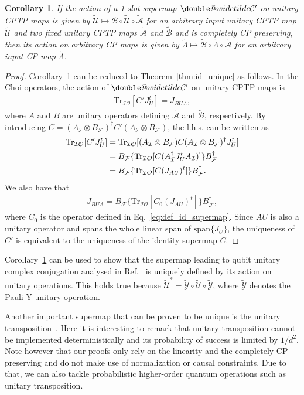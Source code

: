 \documentclass[a4paper,twocolumn,accepted=2022-10-23]{quantumarticle}
\makeatletter
\newcommand{\Tr}[0]{{\mathrm{Tr}}}
\newcommand{\fcal}[0]{{\mathcal{F}}}
\newcommand{\ical}[0]{{\mathcal{I}}}
\newcommand{\ocal}[0]{{\mathcal{O}}}
\newcommand{\doublewidetilde}[1]{{%
  \mathpalette\double@widetilde{#1}%
}}
\newcommand{\double@widetilde}[2]{%
  \sbox\z@{$\m@th#1\widetilde{#2}$}%
  \ht\z@=.9\ht\z@
  \widetilde{\box\z@}%
}
\newcommand{\ttsmap}[1]{\doublewidetilde{\mbox{$\mathcal{#1}$}}}
\newcommand{\tmap}[1]{\widetilde{\mbox{$\mathcal{#1}$}}}
\newcommand{\tmapf}[1]{\widetilde{\mbox{$#1$}}}
\newtheorem{coll}{Corollary}
\theoremstyle{definition}
\makeatother
\begin{document}
\begin{coll}\label{coll:single_unique}
If the action of a 1-slot supermap $\ttsmap{C'}$ on unitary CPTP maps is given by $\tmap{U} \mapsto \tmap{B} \circ \tmap{U} \circ \tmap{A}$ for an arbitrary input unitary CPTP map $\tmap{U}$ and two fixed unitary CPTP maps $\tmap{A}$ and $\tmap{B}$ and is completely CP preserving,
then its action on arbitrary CP maps is given by $\tmapf{\Lambda} \mapsto \tmap{B} \circ \tmapf{\Lambda} \circ \tmap{A}$ for an arbitrary input CP map $\tmapf{\Lambda}$.
\end{coll}
\begin{proof}
Corollary~\ref{coll:single_unique} can be reduced to Theorem~\ref{thm:id_unique} as follows.
In the Choi operators, the action of $\ttsmap{C'}$ on unitary CPTP maps is
\begin{align}
\Tr_{\ical \ocal} [ C' J_{U}^t ] = J_{BUA},
\end{align}
where $A$ and $B$ are unitary operators defining $\tmap{A}$ and $\tmap{B}$, respectively.
By introducing $C = (A_{\ical} \otimes B_{\fcal})^\dag C' (A_{\ical} \otimes B_{\fcal})$,
the l.h.s. can be written as
\begin{align}
\Tr_{\ical \ocal} [ C' J_{U}^t ]
&= \Tr_{\ical \ocal} [(A_\ical \otimes B_\fcal) C (A_\ical \otimes B_\fcal)^\dag J_U^t] \notag \\
&= B_\fcal \{ \Tr_{\ical \ocal} [C ( A_\ical^\dag J_U^t A_\ical )] \} B_\fcal^\dag \notag \\
&= B_\fcal \{ \Tr_{\ical \ocal} [C ( J_{AU} )^t ] \} B_\fcal^\dag.
\end{align}
We also have that
\begin{align}
J_{BUA} = B_\fcal \{ \Tr_{\ical \ocal} [C_0 ( J_{AU} )^t ] \} B_\fcal^\dag,
\end{align}
where $C_0$ is the operator defined in Eq.~\eqref{eq:def_id_supermap}.
Since $AU$ is also a unitary operator and spans the whole linear span of $\mathrm{span}\{ J_U \}$,
the uniqueness of $C'$ is equivalent to the uniqueness of the identity supermap $C$.
\end{proof}

Corollary~\ref{coll:single_unique} can be used to show that the supermap leading to qubit unitary complex conjugation analysed in Ref.~\cite{unitary_conjugate} is uniquely defined by its action on unitary operations. This holds true because
$\tmap{U}^* = \tmap{Y} \circ \tmap{U} \circ \tmap{Y}$, where $\tmap{Y}$ denotes the Pauli Y unitary operation.


Another important supermap that can be proven to be unique is the unitary transposition~\cite{unitary_inversion1,unitary_inversion2}. Here it is interesting to remark that unitary transposition cannot be implemented deterministically and its probability of success is limited by $1/d^2$. Note however that our proofs only rely on the linearity and the completely CP preserving and do not make use of normalization or causal constraints. Due to that, we can also tackle probabilistic higher-order quantum operations such as unitary transposition.
\end{document}
